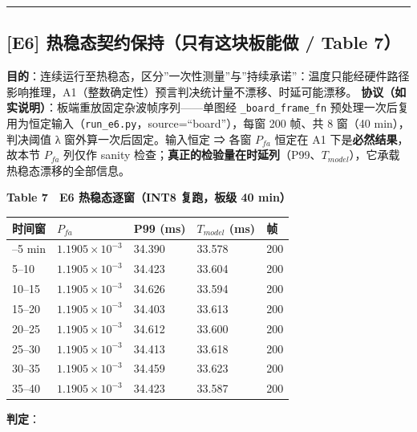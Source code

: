 \begin{center}\rule{0.5\linewidth}{0.5pt}\end{center}

\subsection{{[}E6{]} 热稳态契约保持（只有这块板能做 / Table
7）}\label{e6-ux70edux7a33ux6001ux5951ux7ea6ux4fddux6301ux53eaux6709ux8fd9ux5757ux677fux80fdux505a-table-7}

\textbf{目的}：连续运行至热稳态，区分''一次性测量''与''持续承诺''：温度只能经硬件路径影响推理，A1（整数确定性）预言判决统计量不漂移、时延可能漂移。
\textbf{协议（如实说明）}：板端重放固定杂波帧序列------单图经
\texttt{\_board\_frame\_fn}
预处理一次后复用为恒定输入（\texttt{run\_e6.py}，source=``board''），每窗
200 帧、共 8 窗（40 min），判决阈值 λ 窗外算一次后固定。输入恒定 ⇒ 各窗
\(P_{fa}\) 恒定在 A1 下是\textbf{必然结果}，故本节 \(P_{fa}\) 列仅作
sanity
检查；\textbf{真正的检验量在时延列}（P99、\(T_{model}\)），它承载热稳态漂移的全部信息。

\textbf{Table 7　E6 热稳态逐窗（INT8 复跑，板级 40 min）}

{\def\LTcaptype{none} %
\begin{longtable}[]{@{}lllll@{}}
\toprule\noalign{}
时间窗 & \(P_{fa}\) & P99 (ms) & \(T_{model}\) (ms) & 帧 \\
\midrule\noalign{}
\endhead
\bottomrule\noalign{}
\endlastfoot
0--5 min & \(1.1905{\times}10^{-3}\) & 34.390 & 33.578 & 200 \\
5--10 & \(1.1905{\times}10^{-3}\) & 34.423 & 33.604 & 200 \\
10--15 & \(1.1905{\times}10^{-3}\) & 34.626 & 33.594 & 200 \\
15--20 & \(1.1905{\times}10^{-3}\) & 34.403 & 33.613 & 200 \\
20--25 & \(1.1905{\times}10^{-3}\) & 34.612 & 33.600 & 200 \\
25--30 & \(1.1905{\times}10^{-3}\) & 34.413 & 33.618 & 200 \\
30--35 & \(1.1905{\times}10^{-3}\) & 34.459 & 33.623 & 200 \\
35--40 & \(1.1905{\times}10^{-3}\) & 34.423 & 33.587 & 200 \\
\end{longtable}
}

\textbf{判定}：

